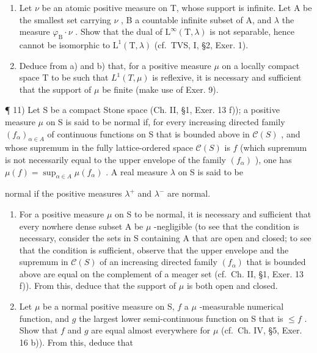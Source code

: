 \begin{enumerate}
\def\labelenumi{\alph{enumi})}
\setcounter{enumi}{1}
\item
  Let \(\nu\) be an atomic positive measure on T, whose support is infinite. Let A be the smallest set carrying \(\nu\) , B a countable infinite subset of A, and \(\lambda\) the measure \(\varphi_{\mathrm{B}} \cdot \nu\) . Show that the dual of \(\mathrm{L}^{\infty}(\mathrm{T}, \lambda)\) is not separable, hence cannot be isomorphic to \(\mathrm{L}^{1}(\mathrm{T}, \lambda)\) (cf.~TVS, I, §2, Exer. 1).
\item
  Deduce from a) and b) that, for a positive measure \(\mu\) on a locally compact space T to be such that \(L^{1}(T,\mu)\) is reflexive, it is necessary and sufficient that the support of \(\mu\) be finite (make use of Exer. 9).
\end{enumerate}

¶ 11) Let S be a compact Stone space (Ch. II, §1, Exer. 13 f)); a positive measure \(\mu\) on S is said to be normal if, for every increasing directed family \((f_{\alpha})_{\alpha \in A}\) of continuous functions on S that is bounded above in \(\mathcal{C}(S)\) , and whose supremum in the fully lattice-ordered space \(\mathcal{C}(S)\) is \(f\) (which supremum is not necessarily equal to the upper envelope of the family \((f_{\alpha})\) ), one has \(\mu(f) = \sup_{\alpha \in A} \mu(f_{\alpha})\) . A real measure \(\lambda\) on S is said to be

normal if the positive measures \(\lambda^{+}\) and \(\lambda^{-}\) are normal.

\begin{enumerate}
\def\labelenumi{\alph{enumi})}
\item
  For a positive measure \(\mu\) on S to be normal, it is necessary and sufficient that every nowhere dense subset A be \(\mu\) -negligible (to see that the condition is necessary, consider the sets in S containing A that are open and closed; to see that the condition is sufficient, observe that the upper envelope and the supremum in \(\mathcal{C}(S)\) of an increasing directed family \((f_{\alpha})\) that is bounded above are equal on the complement of a meager set (cf.~Ch. II, §1, Exer. 13 f)). From this, deduce that the support of \(\mu\) is both open and closed.
\item
  Let \(\mu\) be a normal positive measure on S, \(f\) a \(\mu\) -measurable numerical function, and \(g\) the largest lower semi-continuous function on S that is \(\leqslant f\) . Show that \(f\) and \(g\) are equal almost everywhere for \(\mu\) (cf.~Ch. IV, §5, Exer. 16 b)). From this, deduce that
\end{enumerate}

